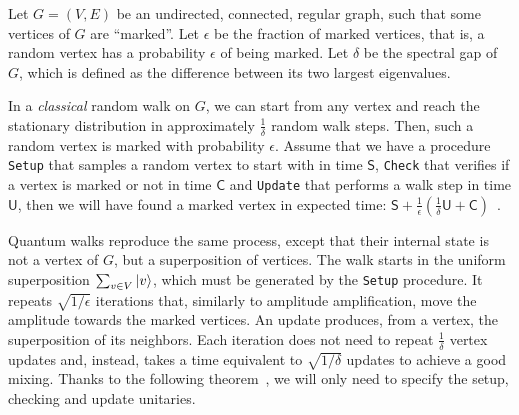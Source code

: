 %
%



Let $G = (V,E)$ be an undirected, connected, regular graph, such that some vertices of $G$ are ``marked''. Let $\epsilon$ be the fraction of marked vertices, that is, a random vertex has a probability $\epsilon$ of being marked. Let $\delta$ be the spectral gap of $G$, which is defined as the difference between its two largest eigenvalues.

In a \emph{classical} random walk on $G$, we can start from any vertex and reach the stationary distribution in approximately $\frac{1}{\delta}$ random walk steps. Then, such a random vertex is marked with probability $\epsilon$. Assume that we have a procedure \texttt{Setup} that samples a random vertex to start with in time $\mathsf{S}$, \texttt{Check} that verifies if a vertex is marked or not in time $\mathsf{C}$ and \texttt{Update} that performs a walk step in time $\mathsf{U}$, then we will have found a marked vertex in expected time:  $ \mathsf{S} + \frac{1}{\epsilon} \left( \frac{1}{\delta} \mathsf{U} + \mathsf{C} \right) \enspace. $

Quantum walks reproduce the same process, except that their internal state is not a vertex of $G$, but a superposition of vertices. The walk starts in the uniform superposition $\sum_{v \in V} \left| v \right\rangle$, which must be generated by the \texttt{Setup} procedure. It repeats $\sqrt{1/ \epsilon}$ iterations that, similarly to amplitude amplification, move the amplitude towards the marked vertices. An update produces, from a vertex, the superposition of its neighbors. Each iteration does not need to repeat $\frac{1}{\delta}$ vertex updates and, instead, takes a time equivalent to $\sqrt{1/\delta}$ updates to achieve a good mixing.
Thanks to the following theorem~, we will only need to specify the setup, checking and update unitaries.


